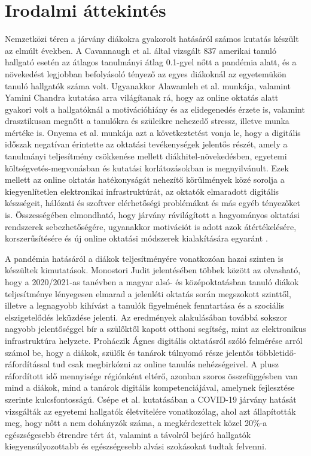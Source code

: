 \documentclass[12pt]{article}
\begin{document}
\newpage

\section{Irodalmi áttekintés}

Nemzetközi téren a járvány diákokra gyakorolt hatásáról számos kutatás készült az elmúlt években. A Cavannaugh et al. \cite{student_perf1} által vizsgált 837 amerikai tanuló hallgató esetén az átlagos tanulmányi átlag 0.1-gyel nőtt a pandémia alatt, és a növekedést legjobban befolyásoló tényező az egyes diákoknál az egyetemükön tanuló hallgatók száma volt. Ugyanakkor Alawamleh et al. \cite{student_perf8} munkája, valamint Yamini Chandra \cite{student_perf6} kutatása arra világítanak rá, hogy az online oktatás alatt gyakori volt a hallgatóknál a motivációhiány és az elidegenedés érzete is, valamint drasztikusan megnőtt a tanulókra és szüleikre nehezedő stressz, illetve munka mértéke is.
Onyema et al. \cite{student_perf5} munkája azt a következtetést vonja le, hogy a digitális időszak negatívan érintette az oktatási tevékenységek jelentős részét, amely a tanulmányi teljesítmény csökkenése mellett diákhitel-növekedésben, egyetemi költségvetés-megvonásban és kutatási korlátozásokban is megnyilvánult. Ezek mellett az online oktatás hatékonyságát nehezítő körülmények közé sorolja a kiegyenlítetlen elektronikai infrastruktúrát, az oktatók elmaradott digitális készségeit, hálózati és szoftver elérhetőségi problémákat és más egyéb tényezőket is.
Összességében elmondható, hogy járvány rávilágított a hagyományos oktatási rendszerek sebezhetőségére, ugyanakkor motivációt is adott azok átértékelésére, korszerűsítésére és új online oktatási módszerek kialakítására egyaránt \cite{student_perf7, student_perf9}. 

A pandémia hatásáról a diákok teljesítményére vonatkozóan hazai szinten is készültek kimutatások. Monostori Judit \cite{magyar1} jelentésében többek között az olvasható, hogy a 2020/2021-as tanévben a magyar alsó- és középoktatásban tanuló diákok teljesítménye lényegesen elmarad a jelenléti oktatás során megszokott szinttől, illetve a legnagyobb kihívást a tanulók figyelmének fenntartása és a szociális elszigetelődés leküzdése jelenti. Az eredmények alakulásában továbbá sokszor nagyobb jelentőséggel bír a szülőktől kapott otthoni segítség, mint az elektronikus infrastruktúra helyzete.
Proháczik Ágnes \cite{magyar2} digitális oktatásról szóló felmérése arról számol be, hogy  a diákok, szülők és tanárok túlnyomó része jelentős többletidő-ráfordítással tud csak megbirkózni az online tanulás nehézségeivel. A plusz ráfordított idő mennyisége régiónként eltérő, azonban szoros összefüggésben van mind a diákok, mind a tanárok digitális kompetenciájával, amelynek fejlesztése szerinte kulcsfontosságú. 
Csépe et al. \cite{magyar3} kutatásában a COVID-19 járvány hatását vizsgálták az egyetemi hallgatók életvitelére vonatkozólag, ahol azt állapították meg, hogy nőtt a nem dohányzók száma, a megkérdezettek közel 20\%-a egészségesebb étrendre tért át, valamint a távolról bejáró hallgatók kiegyensúlyozottabb és egészségesebb alvási szokásokat tudtak felvenni.
\end{document}
